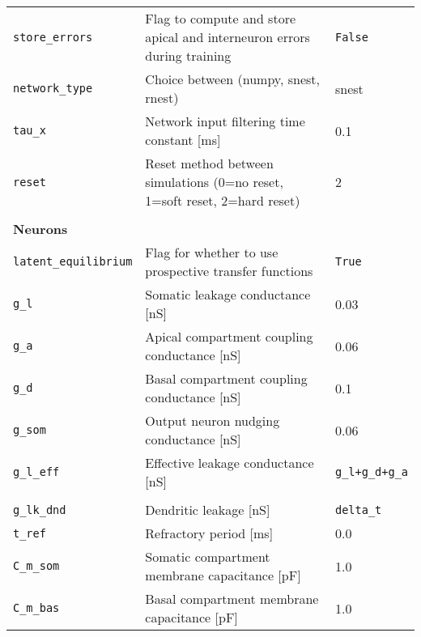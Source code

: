 \begin{table}
\begin{center}
\begin{tabular}{p{}p{}p{}}
      \\
      \texttt{store\_errors}       & Flag to compute and store apical and interneuron errors during training     &
      \texttt{False}
      \\
      \texttt{network\_type}       & Choice between (numpy, snest, rnest)                                        & snest
      \\
      \texttt{tau\_x}              & Network input filtering time constant [ms]                                  & 0.1
      \\
      \texttt{reset}               & Reset method between simulations (0=no reset, 1=soft reset, 2=hard reset)   & 2
      \\

      \\
      \textbf{Neurons}
      \\\hline
      \texttt{latent\_equilibrium} & Flag for whether to use prospective transfer functions                      &
      \texttt{True}
      \\
      \texttt{g\_l}                & Somatic leakage conductance [nS]                                            & 0.03
      \\
      \texttt{g\_a}                & Apical compartment coupling conductance [nS]                                & 0.06
      \\
      \texttt{g\_d}                & Basal compartment coupling conductance [nS]                                 & 0.1
      \\
      \texttt{g\_som}              & Output neuron nudging conductance [nS]                                      & 0.06
      \\
      \texttt{g\_l\_eff}           & Effective leakage conductance [nS]                                          &
      \texttt{g\_l+g\_d+g\_a}
      \\
      \\
      \texttt{g\_lk\_dnd}          & Dendritic leakage [nS]                                                      &
      \texttt{delta\_t}
      \\
      \texttt{t\_ref}              & Refractory period [ms]                                                      & 0.0
      \\
      \texttt{C\_m\_som}           & Somatic compartment membrane capacitance [pF]                               & 1.0
      \\
      \texttt{C\_m\_bas}           & Basal compartment membrane capacitance [pF]                                 & 1.0

\end{tabular}
\end{center}
\end{table}
